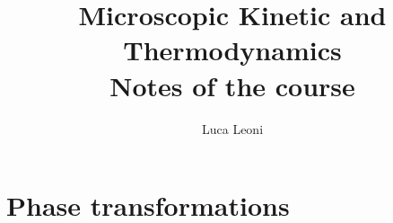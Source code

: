 \documentclass[12pt]{report}
\title{\Huge{Microscopic Kinetic and Thermodynamics}\\Notes of the course}
\author{\huge{Luca Leoni}}
\date{}
\begin{document}
    \maketitle

    \tableofcontents



    \chapter{Phase transformations}
    
\end{document}
